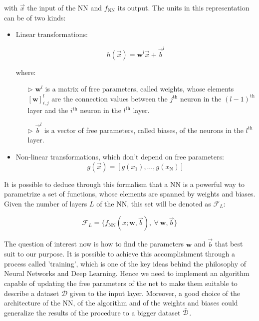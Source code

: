 \noindent
with $\vec{x}$ the input of the NN and $f_\mathrm{NN}$ its output. The units in this representation can be of two kinds:
\begin{itemize}
    \item Linear transformations:
    
    \begin{equation}
        h(\vec{x}) = \mathbf{w}^l\vec{x} + \vec{b}^l
    \end{equation}
    
    \noindent
    where:
    \begin{itemize}
        \item[$\triangleright$] $\mathbf{w}^l$ is a matrix of free parameters, called weights, whose elements $[\mathbf{w}]_{i,j}^l$ are the connection values between the $j^\text{th}$ neuron in the $(l-1)^\text{th}$ layer and the $i^\text{th}$ neuron in the $l^\text{th}$ layer.
        \item[$\triangleright$] $\vec{b}^l$ is a vector of free parameters, called biases, of the neurons in the $l^\text{th}$ layer.
    \end{itemize}
    
    \item Non-linear transformations, which don't depend on free parameters:
    \begin{equation}
        g(\vec{x}) = [g(x_1),\dots,g(x_\mathrm{N})]
    \end{equation}
\end{itemize}

It is possible to deduce through this formalism that a NN is a powerful way to parametrize a set of functions, whose elements are spanned by weights and biases. Given the number of layers $L$ of the NN, this set will be denoted as $\mathcal{F}_{L}$:

\begin{equation}
    \mathcal{F}_{L} = \{ f_\mathrm{NN}(x;\mathbf{w},\vec{b}), \ \forall \ \mathbf{w},\vec{b} \}
\end{equation}

The question of interest now is how to find the parameters $\mathbf{w}$ and $\vec{b}$ that best suit to our purpose. It is possible to achieve this accomplishment through a process called 'training', which is one of the key ideas behind the philosophy of Neural Networks and Deep Learning. Hence we need to implement an algorithm capable of updating the free parameters of the net to make them suitable to describe a dataset $\mathcal{D}$ given to the input layer. Moreover, a good choice of the architecture of the NN, of the algorithm and of the weights and biases could generalize the results of the procedure to a bigger dataset $\Tilde{\mathcal{D}}$.

